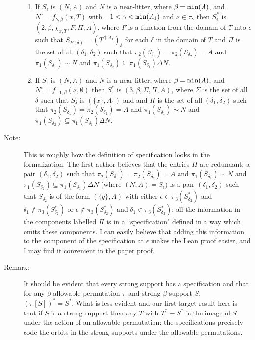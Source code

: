 \documentclass[112pt]{article}
\begin{document}
\begin{description}
\begin{enumerate}
\item  If $S_\epsilon$ is $(N,A)$ and $N$ is a near-litter, where $\beta={\tt min}(A)$, and $N^\circ=f_{\gamma,\beta}(x,T)$ with $-1<\gamma<{\tt min}(A_1)$ and $x\in \tau_\gamma$ then 
$S^*_\epsilon$ is $(2,\beta,\chi_{x,T},F,\Pi,A)$, where $F$ is a function from the domain of $T$ into $\epsilon$
such that $S_{F(\delta)} = (T^{\uparrow A_1})_\delta$ for each $\delta$ in the domain of $T$ and $\Pi$ is the set of all $(\delta_1,\delta_2)$ such that $\pi_2(S_{\delta_1}) = \pi_2(S_{\delta_2}) = A$ and $\pi_1(S_{\delta_1})\sim N$ and $\pi_1(S_{\delta_2}) \subseteq \pi_1(S_{\delta_1}) \Delta N$.

\item  If $S_\epsilon$ is $(N,A)$ and $N$ is a near-litter, where $\beta={\tt min}(A)$, and $N^\circ=f_{-1,\beta}(x,\emptyset)$  then $S^*_\epsilon$ is $(3,\beta,\Sigma,\Pi,A)$, where  $\Sigma$ is the set of all $\delta$ such that $S_\delta$ is $(\{x\},A_1)$
and and $\Pi$ is the set of all $(\delta_1,\delta_2)$ such that $\pi_2(S_{\delta_1}) = \pi_2(S_{\delta_2}) = A$ and $\pi_1(S_{\delta_1})\sim N$ and $\pi_1(S_{\delta_2}) \subseteq \pi_1(S_{\delta_1}) \Delta N$.

\end{enumerate}

\item[Note:]  This is roughly how the definition of specification looks in the formalization.  The first author believes that the entries $\Pi$ are redundant:  a pair $(\delta_1,\delta_2)$ such that $\pi_2(S_{\delta_1}) = \pi_2(S_{\delta_2}) = A$ and $\pi_1(S_{\delta_1})\sim N$ and $\pi_1(S_{\delta_2}) \subseteq \pi_1(S_{\delta_1}) \Delta N$ (where $(N,A) = S_\epsilon$) is a pair $(\delta_1,\delta_2)$ such that $S_{\delta_2}$ is of the form $(\{y\},A)$ with either $\epsilon \in \pi_3(S^*_{\delta_2})$ and $\delta_1 \not\in \pi_3(S^*_{\delta_2})$ or $\epsilon \not\in \pi_3(S^*_{\delta_2})$ and $\delta_1 \in \pi_3(S^*_{\delta_2})$:  all the information in the components labelled $\Pi$ is in a ``specification" defined in a way which omits these components.  I can easily believe that adding this information to the component of the specification at $\epsilon$ makes the Lean proof easier, and I may find it convenient in the paper proof.

\item[Remark:]  It should be evident that every strong support has a specification and that for any $\beta$-allowable permutation $\pi$ and strong $\beta$-support $S$,
$(\pi[S])^* = S^*$.  What is less evident and our first target result here is that if $S$ is a strong support then any $T$ with $T^* = S^*$ is the image of $S$ under the action of an allowable permutation:  the specifications precisely code the orbits in the strong supports under the allowable permutations.


\end{description}
\end{document}
